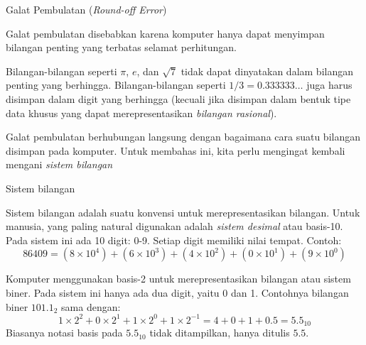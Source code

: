 
\begin{frame}{Galat Pembulatan (\textit{Round-off Error})}

Galat pembulatan disebabkan karena komputer hanya dapat menyimpan bilangan penting
yang terbatas selamat perhitungan.

Bilangan-bilangan seperti $\pi$, $e$, dan $\sqrt{7}$ tidak dapat dinyatakan
dalam bilangan penting yang berhingga.
Bilangan-bilangan seperti $1/3 = 0.333333\ldots$ juga harus disimpan dalam digit
yang berhingga (kecuali jika disimpan dalam bentuk tipe data khusus yang dapat merepresentasikan
\emph{bilangan rasional}).

Galat pembulatan berhubungan langsung dengan bagaimana cara suatu bilangan
disimpan pada komputer. Untuk membahas ini, kita perlu mengingat kembali
mengani \emph{sistem bilangan}

\end{frame}


\begin{frame}{Sistem bilangan}

Sistem bilangan adalah suatu konvensi untuk merepresentasikan bilangan.
Untuk manusia, yang paling natural digunakan adalah \emph{sistem desimal} atau
basis-10. Pada sistem ini ada 10 digit: 0-9. Setiap digit memiliki nilai tempat.
Contoh:
$$
86409 = (8 \times 10^4) + (6 \times 10^3) + (4 \times 10^2) + (0 \times 10^1) +
(9\times 10^0)
$$

Komputer menggunakan basis-2 untuk merepresentasikan bilangan atau sistem biner.
Pada sistem ini hanya ada dua digit, yaitu 0 dan 1.
Contohnya bilangan biner $101.1_{2}$ sama dengan:
\begin{equation*}
1 \times 2^2 + 0 \times 2^1 + 1 \times 2^0 + 1 \times 2^{-1} = 4 + 0 + 1 + 0.5 = 5.5_{10}
\end{equation*}
Biasanya notasi basis pada $5.5_{10}$ tidak ditampilkan, hanya ditulis $5.5$.

\end{frame}




